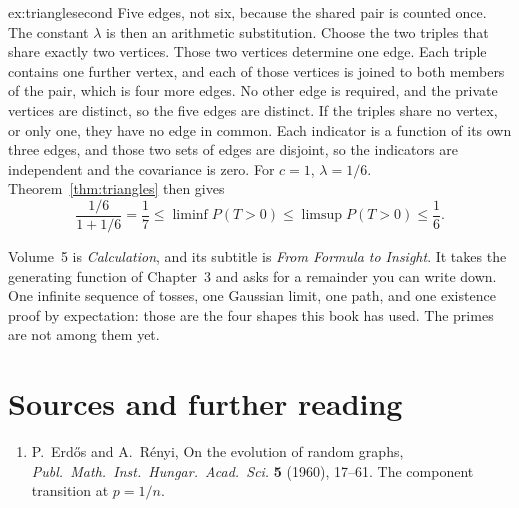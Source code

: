 \begin{solution}{ex:trianglesecond}
\idea Five edges, not six, because the shared pair is counted once. The constant $\lambda$ is then an arithmetic substitution.
\writeup Choose the two triples that share exactly two vertices. Those two vertices determine one edge. Each triple contains one further vertex, and each of those vertices is joined to both members of the pair, which is four more edges. No other edge is required, and the private vertices are distinct, so the five edges are distinct. If the triples share no vertex, or only one, they have no edge in common. Each indicator is a function of its own three edges, and those two sets of edges are disjoint, so the indicators are independent and the covariance is zero. For $c=1$, $\lambda=1/6$. Theorem~\ref{thm:triangles} then gives
\[
 \frac{1/6}{1+1/6}=\frac17
 \le\liminf P(T>0)
 \le\limsup P(T>0)
 \le\frac16.
\]
\end{solution}

Volume~5 is \emph{Calculation}, and its subtitle is \emph{From Formula to Insight}. It takes the generating function of Chapter~3 and asks for a remainder you can write down. One infinite sequence of tosses, one Gaussian limit, one path, and one existence proof by expectation: those are the four shapes this book has used. The primes are not among them yet.

\section*{Sources and further reading}

\begin{enumerate}
\item P.~Erd\H os and A.~R\'enyi, On the evolution of random graphs, \emph{Publ.\ Math.\ Inst.\ Hungar.\ Acad.\ Sci.} \textbf{5} (1960), 17--61. The component transition at $p=1/n$.
\end{enumerate}
